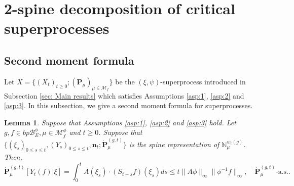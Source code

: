 \documentclass[UTF8]{pkuthss}
\theoremstyle{plain}
\newtheorem{lem}[thm]{Lemma}
\theoremstyle{definition}
\numberwithin{equation}{section}
\begin{document}
\section{2-spine decomposition of critical superprocesses}

\subsection{Second moment formula}
\label{sec: Second moment formula}
Let $X=\{(X_t)_{t\geq 0}; (\mathbf P_\mu)_{\mu \in \mathcal M_f}\}$ be the $(\xi,\psi)$-superprocess introduced in Subsection \ref{sec: Main results} which satisfies Assumptions \ref{asp:1}, \ref{asp:2} and \ref{asp:3}.
In this subsection, we give a second moment formula for  superprocesses.
\begin{lem}
\label{lem:1stMomSizBiasSupProc}
	Suppose that Assumptions  \ref{asp:1}, \ref{asp:2} and \ref{asp:3} hold.
	Let $g,f\in bp\mathscr B_E^\phi, \mu \in \mathcal M^\phi_f$ 
	and $t\geq 0$.
	Suppose that $\{(\xi_s)_{0\leq s\leq t}, (Y_s)_{0\leq s\leq t}, \mathbf n_t; \dot {\mathbf P}^{(g,t)}_\mu\}$ is the spine representation of $\mathbb N_\mu^{w_t(g)}$.
	Then,
\[
	\dot{\mathbf P}_{\mu}^{(g,t)} [Y_t(f)|\xi]
    = \int_0^t A(\xi_s) \cdot (S_{t-s} f) (\xi_s) ds
	\leq t \|A \phi\|_{\infty} \|\phi^{-1}f\|_\infty,
	\quad \dot{\mathbf P}^{(g,t)}_{\mu} \text{-a.s.}.
\]
\end{lem}
\end{document}
